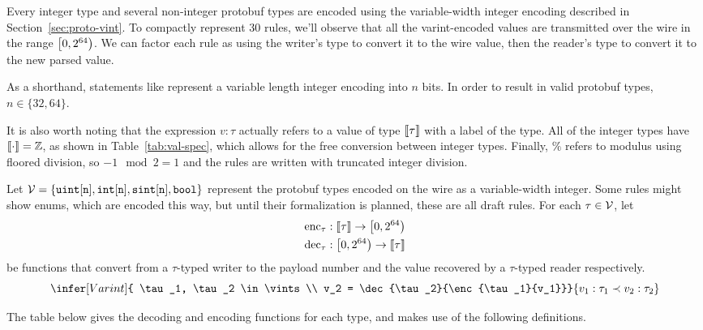 Every integer type and several non-integer protobuf types are encoded using the
variable-width integer encoding described in Section~\ref{sec:proto-vint}. To
compactly represent 30 rules, we'll observe that all the varint-encoded values
are transmitted over the wire in the range $\left[0, 2^{64}\right)$. We can factor each
rule as using the writer's type to convert it to the wire value, then the
reader's type to convert it to the new parsed value.

As a shorthand, statements like  represent a variable length integer
encoding into $n$ bits. In order to result in valid protobuf types,
$n \in \{32, 64\}$. 

It is also worth noting that the expression $v : \tau$ actually refers to a value
of type $\llbracket{} \tau \rrbracket{}$ with a label of the type. All of the integer
types have $\llbracket{} \cdot \rrbracket{} = \mathbb{Z}$, as shown in Table~\ref{tab:val-spec},
which allows for the free conversion between integer types. Finally, $\%$ refers
to modulus using floored division, so $-1 \mod 2 = 1$ and the rules are
written with truncated integer division.

Let $\mathcal{V} = \left\{ \texttt{uint}[\texttt{n}], \texttt{int}[\texttt{n}], \texttt{sint}[\texttt{n}], \texttt{bool} \right\}$ represent
the protobuf types encoded on the wire as a variable-width integer. Some rules
might show enums, which are encoded this way, but until their formalization is
planned, these are all draft rules. For each $\tau \in \mathcal{V}$, let
\begin{align*}
  \mathrm{enc}_{\tau} &: \llbracket{} \tau \rrbracket{} \rightarrow \left[0, 2^{64}\right) \\
  \mathrm{dec}_{\tau} &: \left[0, 2^{64}\right) \rightarrow \llbracket{} \tau \rrbracket{}
\end{align*}
be functions that convert from a $\tau$-typed writer to the payload number and
the value recovered by a $\tau$-typed reader respectively.
\[
  \infer[Varint]{ \tau_1, \tau_2 \in \vints \\ v_2 =
    \dec{\tau_2}{\enc{\tau_1}{v_1}}}{v_1 : \tau_1 \prec v_2 : \tau_2}
\]

The table below gives the decoding and encoding functions for each type, and
makes use of the following definitions.

